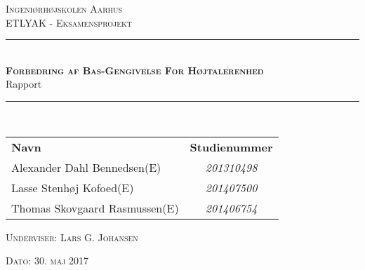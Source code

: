 \newcommand{\HRule}{\rule{\linewidth}{0.1mm}} %

\thispagestyle{empty}
\begin{center}
	\textsc{\LARGE Ingeniørhøjskolen Aarhus}\\[1.5cm] %

	
	\textsc{\large ETLYAK - Eksamensprojekt}\\[2.5cm] 
	\HRule \\[0.8cm]
	{\huge \bfseries \textsc{Forbedring af Bas-Gengivelse For Højtalerenhed}} \\[0.5cm]{\LARGE Rapport} \\[0.4cm]
	\HRule \\[1.5cm]
	
	\vspace{0.5 in}
	\begin{center}
		\begin{tabular}{l c}
			\textbf{Navn} & \textbf{Studienummer} \\
			Alexander Dahl Bennedsen(E) & \textsl{201310498}    \\
			Lasse Stenhøj Kofoed(E) & \textsl{201407500}  \\
			Thomas Skovgaard Rasmussen(E) & \textsl{201406754}
			
			
		\end{tabular}
	\end{center}
	\vspace{0.5 in}
	
	\textsc{\large Underviser: Lars G. Johansen}
	\vspace{0.5 in}
	
	\textsc{\large Dato: 30. maj 2017}\\
	
\end{center} %

\newpage